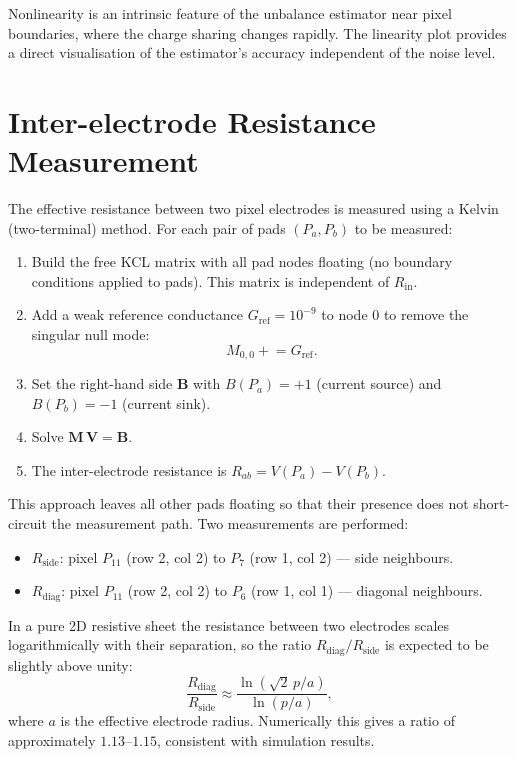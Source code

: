 \documentclass[preprint,numbers,1p]{elsarticle}
\begin{document}
Nonlinearity is an intrinsic feature of the unbalance estimator near pixel boundaries, where
the charge sharing changes rapidly. The linearity plot provides a direct visualisation of the
estimator's accuracy independent of the noise level.

\section{Inter-electrode Resistance Measurement}
\label{sec:resistance}

The effective resistance between two pixel electrodes is measured using a Kelvin (two-terminal)
method. For each pair of pads $(P_a, P_b)$ to be measured:

\begin{enumerate}
  \item Build the free KCL matrix with all pad nodes floating (no boundary conditions applied to pads). This matrix is independent of $R_\mathrm{in}$.
  \item Add a weak reference conductance $G_\mathrm{ref} = 10^{-9}$ to node 0 to remove the
        singular null mode:
        \begin{equation}
          M_{0,0} \mathrel{+}= G_\mathrm{ref}.
        \end{equation}
  \item Set the right-hand side $\mathbf{B}$ with $B(P_a) = +1$ (current source) and
        $B(P_b) = -1$ (current sink).
  \item Solve $\mathbf{M}\,\mathbf{V} = \mathbf{B}$.
  \item The inter-electrode resistance is $R_{ab} = V(P_a) - V(P_b)$.
\end{enumerate}

This approach leaves all other pads floating so that their presence does not short-circuit the
measurement path. Two measurements are performed:

\begin{itemize}
  \item $R_\mathrm{side}$: pixel $P_{11}$ (row 2, col 2) to $P_7$ (row 1, col 2) --- side neighbours.
  \item $R_\mathrm{diag}$: pixel $P_{11}$ (row 2, col 2) to $P_6$ (row 1, col 1) --- diagonal neighbours.
\end{itemize}

In a pure 2D resistive sheet the resistance between two electrodes scales logarithmically with
their separation, so the ratio $R_\mathrm{diag}/R_\mathrm{side}$ is
expected to be slightly above unity:
\begin{equation}
  \frac{R_\mathrm{diag}}{R_\mathrm{side}} \approx \frac{\ln(\sqrt{2}\,p/a)}{\ln(p/a)},
\end{equation}
where $a$ is the effective electrode radius. Numerically this gives a ratio of approximately
$1.13$--$1.15$, consistent with simulation results.
\end{document}
